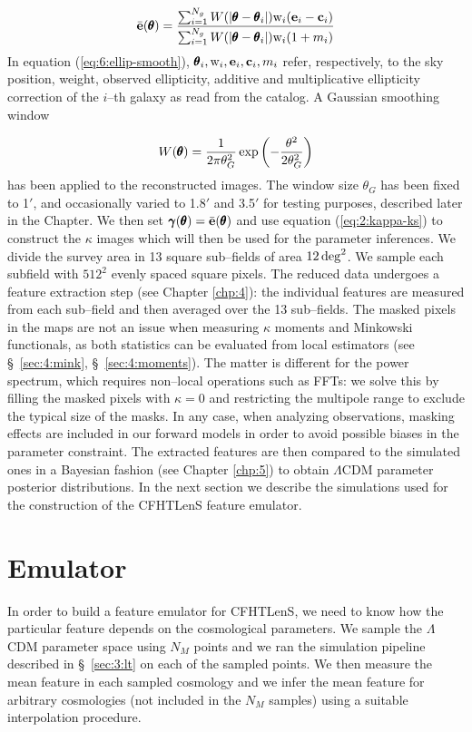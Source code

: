 \begin{equation}
\label{eq:6:ellip-smooth}
\bar{\mathbf{e}}(\pmb{\theta}) = \frac{\sum_{i=1}^{N_g}W(\vert\pmb{\theta}-\pmb{\theta}_i\vert){\rm w}_i(\mathbf{e}_i -\mathbf{c}_i)}{\sum_{i=1}^{N_g}W(\vert\pmb{\theta}-\pmb{\theta}_i\vert){\rm w}_i(1+m_i)}
\end{equation}
%
In equation (\ref{eq:6:ellip-smooth}), $\pmb{\theta}_i,{\rm w}_i,\mathbf{e}_i,\mathbf{c}_i,m_i$ refer, respectively, to the sky position, weight, observed ellipticity, additive and multiplicative ellipticity correction of the $i$--th galaxy as read from the catalog. A Gaussian smoothing window

\begin{equation}
\label{eq:6:gausswin}
W(\pmb{\theta}) = \frac{1}{2\pi\theta_G^2}\exp\left(-\frac{\theta^2}{2\theta_G^2}\right)
\end{equation}
%
has been applied to the reconstructed images. The window size $\theta_G$ has been fixed to 1$'$, and occasionally varied to 1.8$'$ and 3.5$'$ for testing purposes, described later in the Chapter. We then set $\pmb{\gamma}(\pmb{\theta})=\bar{\mathbf{e}}(\pmb{\theta})$ and use equation (\ref{eq:2:kappa-ks}) to construct the $\kappa$ images which will then be used for the parameter inferences. We divide the survey area in 13 square sub--fields of area $12\,{\rm deg}^2$. We sample each subfield with $512^2$ evenly spaced square pixels. The reduced data undergoes a feature extraction step (see Chapter \ref{chp:4}): the individual features are measured from each sub--field and then averaged over the 13 sub--fields. The masked pixels in the maps are not an issue when measuring $\kappa$ moments and Minkowski functionals, as both statistics can be evaluated from local estimators (see \S~\ref{sec:4:mink}, \S~\ref{sec:4:moments}). The matter is different for the power spectrum, which requires non--local operations such as FFTs: we solve this by filling the masked pixels with $\kappa=0$ and restricting the multipole range to exclude the typical size of the masks. In any case, when analyzing observations, masking effects are included in our forward models in order to avoid possible biases in the parameter constraint. The extracted features are then compared to the simulated ones in a Bayesian fashion (see Chapter \ref{chp:5}) to obtain $\Lambda$CDM parameter posterior distributions. In the next section we describe the simulations used for the construction of the CFHTLenS feature emulator.      

\section{Emulator}
In order to build a feature emulator for CFHTLenS, we need to know how the particular feature depends on the cosmological parameters. We sample the $\Lambda$CDM parameter space using $N_M$ points and we ran the simulation pipeline described in \S~\ref{sec:3:lt} on each of the sampled points. We then measure the mean feature in each sampled cosmology and we infer the mean feature for arbitrary cosmologies (not included in the $N_M$ samples) using a suitable interpolation procedure. 

